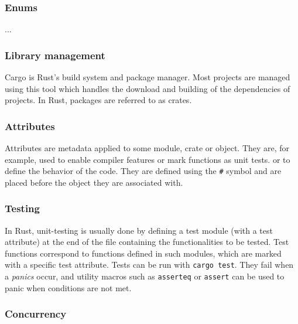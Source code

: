 \subsubsection{Enums}

...

\subsubsection{Library management}

Cargo is Rust's build system and package manager. Most projects are managed using this tool which handles the download and building of the dependencies of projects.
In Rust, packages are referred to as crates.

\subsubsection{Attributes}

Attributes are metadata applied to some module, crate or object. They are, for example, used to enable compiler features or mark functions as unit tests.
or to define the behavior of the code. They are defined using the \texttt{\#} symbol and are placed before the object they are associated with.

\subsubsection{Testing}

In Rust, unit-testing is usually done by defining a test module (with a test attribute) at the end of the file containing the functionalities to be
tested. Test functions correspond to functions defined in such modules, which are marked with a specific test attribute. Tests can be run
with \texttt{cargo test}. They fail when a \textit{panics} occur, and utility macros such as \texttt{asserteq} or \texttt{assert} can be used to panic
when conditions are not met.

\subsubsection{Concurrency}

